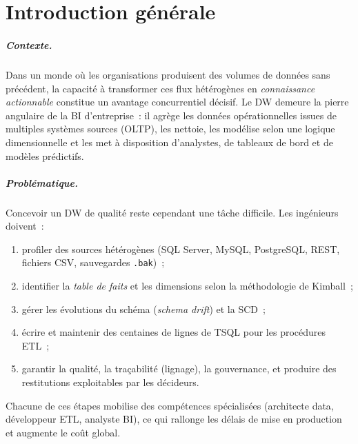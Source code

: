 \documentclass[12pt, a4paper]{report}
\begin{document}
\chapter*{Introduction générale}

\paragraph{Contexte.}
Dans un monde où les organisations produisent des volumes de données
sans précédent, la capacité à transformer ces flux hétérogènes en
\emph{connaissance actionnable} constitue un avantage concurrentiel décisif.
Le \ac{DW} demeure la pierre angulaire de la \ac{BI} d'entreprise~: il
agrège les données opérationnelles issues de multiples systèmes sources
(\ac{OLTP}), les nettoie, les modélise selon une logique dimensionnelle et
les met à disposition d'analystes, de tableaux de bord et de modèles
prédictifs.

\paragraph{Problématique.}
Concevoir un \ac{DW} de qualité reste cependant une tâche difficile.
Les ingénieurs doivent~:
\begin{enumerate}[label=(\alph*)]
  \item profiler des sources hétérogènes (SQL Server, MySQL, PostgreSQL,
        REST, fichiers CSV, sauvegardes \texttt{.bak})~;
  \item identifier la \emph{table de faits} et les dimensions selon la
        méthodologie de Kimball~;
  \item gérer les évolutions du schéma (\emph{schema drift}) et la
        \ac{SCD}~;
  \item écrire et maintenir des centaines de lignes de \ac{TSQL} pour les
        procédures ETL~;
  \item garantir la qualité, la traçabilité (lignage), la gouvernance,
        et produire des restitutions exploitables par les décideurs.
\end{enumerate}
Chacune de ces étapes mobilise des compétences spécialisées
(architecte data, développeur ETL, analyste BI), ce qui rallonge les délais
de mise en production et augmente le coût global.
\end{document}
